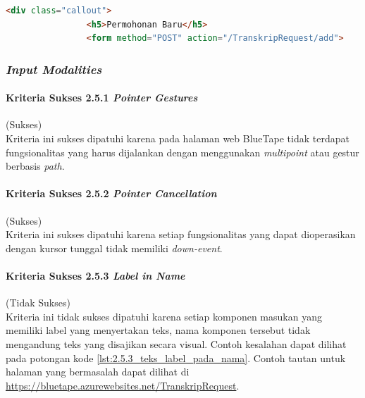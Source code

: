 \documentclass[a4paper,twoside]{article}
\begin{document}
\begin{enumerate}
		\begin{lstlisting}[frame=single, label={lst:2.4.10_heading_tidak_tepat}, language=HTML, caption=Kriteria Sukses 2.4.10 - Penggunaan \textit{Heading} Tidak Tepat]
			<div class="callout">
				<h5>Permohonan Baru</h5>
				<form method="POST" action="/TranskripRequest/add">
		\end{lstlisting}
	
		\subsubsection*{\textit{Input Modalities}}
		\label{subsubsec:kepatuhan_bluetape_input_modalities}

		\paragraph{Kriteria Sukses 2.5.1 \textit{Pointer Gestures}}
		\label{par:kepatuhan_bluetape_kriteria_sukses_2.5.1}
		(Sukses)\\

		Kriteria ini sukses dipatuhi karena pada halaman web BlueTape tidak terdapat fungsionalitas yang harus dijalankan dengan menggunakan \textit{multipoint} atau gestur berbasis \textit{path}.

		\paragraph{Kriteria Sukses 2.5.2 \textit{Pointer Cancellation}}
		\label{par:kepatuhan_bluetape_kriteria_sukses_2.5.2}
		(Sukses)\\

		Kriteria ini sukses dipatuhi karena setiap fungsionalitas yang dapat dioperasikan dengan kursor tunggal tidak memiliki \textit{down-event}.

		\paragraph{Kriteria Sukses 2.5.3 \textit{Label in Name}}
		\label{par:kepatuhan_bluetape_kriteria_sukses_2.5.3}
		(Tidak Sukses)\\

		Kriteria ini tidak sukses dipatuhi karena setiap komponen masukan yang memiliki label yang menyertakan teks, nama komponen tersebut tidak mengandung teks yang disajikan secara visual. Contoh kesalahan dapat dilihat pada potongan kode \ref{lst:2.5.3_teks_label_pada_nama}. Contoh tautan untuk halaman yang bermasalah dapat dilihat di \url{https://bluetape.azurewebsites.net/TranskripRequest}.


\end{enumerate}
\end{document}
